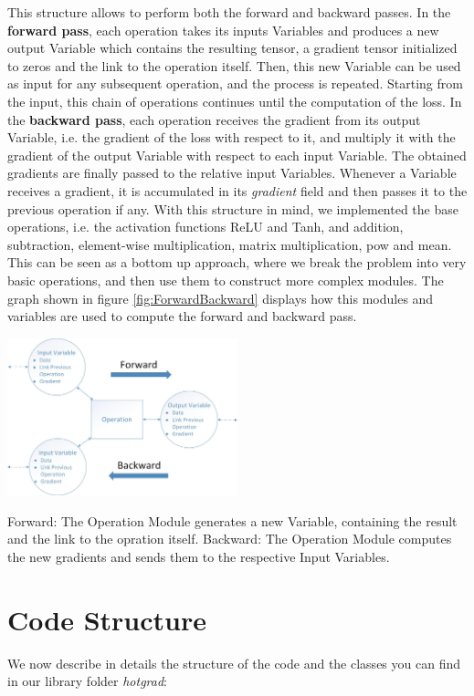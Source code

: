 \documentclass[10pt,conference,compsocconf]{IEEEtran}
\begin{document}
This structure allows to perform both the forward and backward passes. In the \textbf{forward pass}, each operation takes its inputs Variables and produces a new output Variable which contains the resulting tensor, a gradient tensor initialized to zeros and the link to the operation itself. Then, this new Variable can be used as input for any subsequent operation, and the process is repeated. Starting from the input, this chain of operations continues until the computation of the loss. In the \textbf{backward pass}, each operation receives the gradient from its output Variable, i.e. the gradient of the loss with respect to it, and multiply it with the gradient of the output Variable with respect to each input Variable. The obtained gradients are finally passed to the relative input Variables. Whenever a Variable receives a gradient, it is accumulated in its \textit{gradient} field and then passes it to the previous operation if any.
With this structure in mind, we implemented the base operations, i.e. the activation functions ReLU and Tanh, and addition, subtraction, element-wise multiplication, matrix multiplication, pow and mean. This can be seen as a bottom up approach, where we break the problem into very basic operations, and then use them to construct more complex modules. The graph shown in figure \ref{fig:ForwardBackward} displays how this modules and variables are used to compute the forward and backward pass.

\begin{center}
	\label{fig:ForwardBackward}
	\captionsetup{type=figure}
	\includegraphics[width=0.5\textwidth]{img/ForwardBackward.jpg}
	\caption {Forward: The Operation Module generates a new Variable, containing the result and the link to the opration itself. Backward: The Operation Module computes the new gradients and sends them to the respective Input Variables.}
\end{center}        
        
\section{Code Structure}
\label{sec:CodeStructure}
We now describe in details the structure of the code and the classes you can find in our library folder \textit{hotgrad}:
\end{document}
